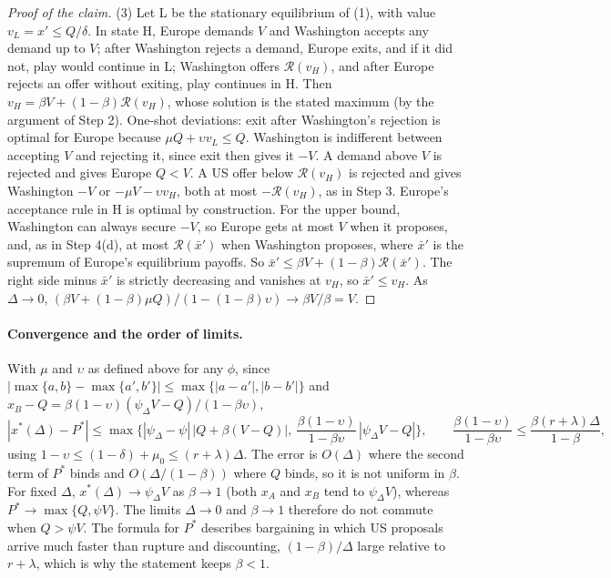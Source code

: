\begin{proof}[Proof of the claim]
(3) Let L be the stationary equilibrium of (1), with value $v_L=x'\le Q/\delta$. In state H, Europe demands $V$ and Washington accepts any demand up to $V$; after Washington rejects a demand, Europe exits, and if it did not, play would continue in L; Washington offers $\mathcal R(v_H)$, and after Europe rejects an offer without exiting, play continues in H. Then $v_H=\beta V+(1-\beta)\mathcal R(v_H)$, whose solution is the stated maximum (by the argument of Step 2). One-shot deviations: exit after Washington's rejection is optimal for Europe because $\mu Q+\upsilon v_L\le Q$. Washington is indifferent between accepting $V$ and rejecting it, since exit then gives it $-V$. A demand above $V$ is rejected and gives Europe $Q<V$. A US offer below $\mathcal R(v_H)$ is rejected and gives Washington $-V$ or $-\mu V-\upsilon v_H$, both at most $-\mathcal R(v_H)$, as in Step 3. Europe's acceptance rule in H is optimal by construction. For the upper bound, Washington can always secure $-V$, so Europe gets at most $V$ when it proposes, and, as in Step 4(d), at most $\mathcal R(\bar x')$ when Washington proposes, where $\bar x'$ is the supremum of Europe's equilibrium payoffs. So $\bar x'\le\beta V+(1-\beta)\mathcal R(\bar x')$. The right side minus $\bar x'$ is strictly decreasing and vanishes at $v_H$, so $\bar x'\le v_H$. As $\Delta\to 0$, $(\beta V+(1-\beta)\mu Q)/(1-(1-\beta)\upsilon)\to\beta V/\beta=V$.
\end{proof}

\paragraph{Convergence and the order of limits.} With $\mu$ and $\upsilon$ as defined above for any $\phi$, since $|\max\{a,b\}-\max\{a',b'\}|\le\max\{|a-a'|,|b-b'|\}$ and $x_B-Q=\beta(1-\upsilon)(\psi_\Delta V-Q)/(1-\beta\upsilon)$,
\[
|x^*(\Delta)-P^*|\le\max\Big\{|\psi_\Delta-\psi|\,\big|Q+\beta(V-Q)\big|,\ \frac{\beta(1-\upsilon)}{1-\beta\upsilon}\,|\psi_\Delta V-Q|\Big\},\qquad \frac{\beta(1-\upsilon)}{1-\beta\upsilon}\le\frac{\beta(r+\lambda)\Delta}{1-\beta},
\]
using $1-\upsilon\le(1-\delta)+\mu_0\le(r+\lambda)\Delta$. The error is $O(\Delta)$ where the second term of $P^*$ binds and $O(\Delta/(1-\beta))$ where $Q$ binds, so it is not uniform in $\beta$. For fixed $\Delta$, $x^*(\Delta)\to\psi_\Delta V$ as $\beta\to 1$ (both $x_A$ and $x_B$ tend to $\psi_\Delta V$), whereas $P^*\to\max\{Q,\psi V\}$. The limits $\Delta\to 0$ and $\beta\to 1$ therefore do not commute when $Q>\psi V$. The formula for $P^*$ describes bargaining in which US proposals arrive much faster than rupture and discounting, $(1-\beta)/\Delta$ large relative to $r+\lambda$, which is why the statement keeps $\beta<1$.

